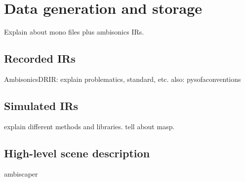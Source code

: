 \chapter{Data generation and storage}



Explain about mono files plus ambisonics IRs.


\section{Recorded IRs}

AmbisonicsDRIR: explain problematics, standard, etc.
also: pysofaconventions


\section{Simulated IRs}

explain different methods and libraries.
tell about masp.


\section{High-level scene description}

ambiscaper




